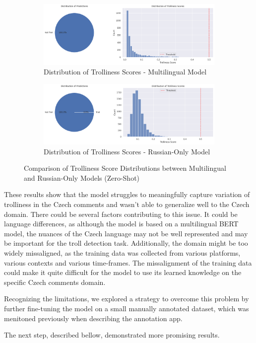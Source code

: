 \documentclass[twoside]{ctuthesis}
\theoremstyle{plain}
\theoremstyle{definition}
\theoremstyle{note}
\begin{document}
\begin{figure}[h]
    \centering
    \begin{subfigure}{0.49\textwidth}
        \includegraphics[width=\linewidth]{figures/distribution_multi.png}
        \caption{Distribution of Trolliness Scores - Multilingual Model}
        \label{fig:distribution_multi}
    \end{subfigure}
    \hfill
    \begin{subfigure}{0.49\textwidth}
        \includegraphics[width=\linewidth]{figures/russian_distribution.png}
        \caption{Distribution of Trolliness Scores - Russian-Only Model}
        \label{fig:russian_distribution}
    \end{subfigure}
    \caption{Comparison of Trolliness Score Distributions between Multilingual and Russian-Only Models (Zero-Shot)}
    \label{fig:distribution_comparison}
\end{figure}

These results show that the model struggles to meaningfully capture variation of trolliness in the Czech comments and wasn't able to generalize well to the Czech domain. There could be several factors contributing to this issue. It could be language differences, as although the model is based on a multilingual BERT model, the nuances of the Czech language may not be well represented and may be important for the troll detection task. Additionally, the domain might be too widely missaligned, as the training data was collected from various platforms, various contexts and various time-frames. The missalignment of the training data could make it quite difficult for the model to use its learned knowledge on the specific Czech comments domain.
\par 
Recognizing the limitations, we explored a strategy to overcome this problem by further fine-tuning the model on a small manually annotated dataset, which was menitoned previously when describing the annotation app.\par
The next step, described bellow, demonstrated more promising results.\par
\end{document}
